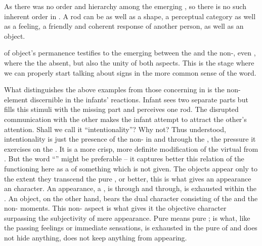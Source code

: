 \pa As there was no order and hierarchy among the emerging , so
there is no such inherent order in . A rod can be
 as well as a shape, a perceptual category as well as a feeling,
a friendly and coherent response of another person, as well as an object.

 of object's permanence testifies to the emerging
 between the  and the non-, even
, where the   the absent, but also the
unity of both aspects. This is the stage where we can properly start talking
about signs in the more common sense of the word.


\pa\label{pa:intentional} What distinguishes the above examples
from those concerning  in  is the
non- element discernible in the infants'
reactions.  Infant sees two separate parts but fills this  stimuli
with the missing part and perceives one rod.  The disrupted communication with
the other makes the infant attempt to attract the other's attention.  Shall we
call it ``intentionality''?  Why not?  Thus understood, intentionality is just
the presence of the non- in and through the
, the pressure it exercises on the .  It is a more
crisp, more definite modification of the virtual  from
.  But the word ``'' might be preferable -- it captures
better this relation of the  functioning here as a  of
something which is not  given.  The objects appear only to the
extent they transcend the pure \hoa, or better, this is what gives an appearance
an  character.  An appearance, a , is  through
and through, is exhausted within the \hoa.  An object, on the other hand, bears
the dual character consisting of the  and the non-
moments.  This non- aspect is what gives it the objective character
surpassing the subjectivity of mere appearance.  Pure  means
pure ;  is what, like the passing feelings or
immediate sensations, is exhausted in the pure  of  and does not hide anything, does not keep anything from appearing.

